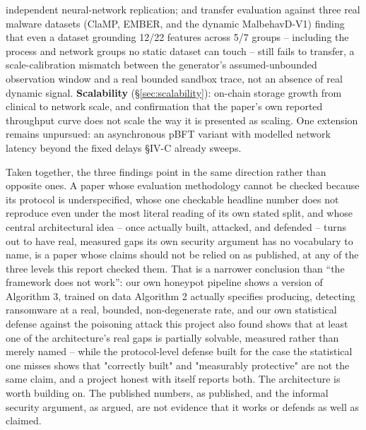 \documentclass[conference]{IEEEtran}
\begin{document}
independent neural-network replication; and transfer evaluation against three real malware
datasets (ClaMP, EMBER, and the dynamic MalbehavD-V1) finding that even a dataset grounding 12/22
features across 5/7 groups -- including the process and network groups no static dataset can touch
-- still fails to transfer, a scale-calibration mismatch between the generator's assumed-unbounded
observation window and a real bounded sandbox trace, not an absence of real dynamic signal.
\textbf{Scalability} (\S\ref{sec:scalability}): on-chain storage growth from clinical to
network scale, and confirmation that the paper's own reported throughput curve does not scale
the way it is presented as scaling. One extension remains unpursued: an asynchronous pBFT variant
with modelled network latency beyond the fixed delays \S IV-C already sweeps.

Taken together, the three findings point in the same direction rather than opposite ones. A paper
whose evaluation methodology cannot be checked because its protocol is underspecified, whose one
checkable headline number does not reproduce even under the most literal reading of its own
stated split, and whose central architectural idea -- once actually built, attacked, and
defended -- turns out to have real, measured gaps its own security argument has no vocabulary to
name, is a paper whose claims should not be relied on as published, at any of the three levels
this report checked them. That is a narrower conclusion than ``the framework does not work'': our
own honeypot pipeline shows a version of Algorithm 3, trained on data Algorithm 2 actually
specifies producing, detecting ransomware at a real, bounded, non-degenerate rate, and our own
statistical defense against the poisoning attack this project also found shows that at least one
of the architecture's real gaps is partially solvable, measured rather than merely named -- while
the protocol-level defense built for the case the statistical one misses shows that "correctly
built" and "measurably protective" are not the same claim, and a project honest with itself
reports both. The architecture is worth building on. The published numbers, as published, and the
informal security argument, as argued, are not evidence that it works or defends as well as
claimed.
\end{document}
